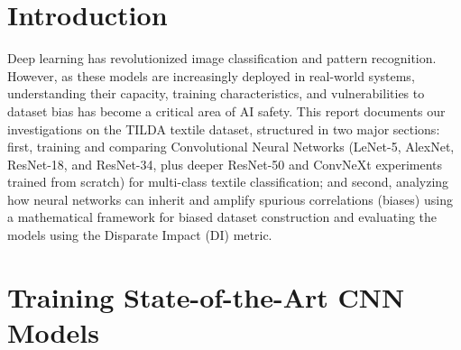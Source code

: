 \documentclass{name}
\newcounter{pagezero}
\begin{document}
\par 
\setcounter{page}{\value{pagezero}}

\newpage
\setcounter{page}{\value{pagezero}}
\tableofcontents

\newpage

\section{Introduction}
Deep learning has revolutionized image classification and pattern recognition. However, as these models are increasingly deployed in real-world systems, understanding their capacity, training characteristics, and vulnerabilities to dataset bias has become a critical area of AI safety. This report documents our investigations on the TILDA textile dataset, structured in two major sections: first, training and comparing Convolutional Neural Networks (LeNet-5, AlexNet, ResNet-18, and ResNet-34, plus deeper ResNet-50 and ConvNeXt experiments trained from scratch) for multi-class textile classification; and second, analyzing how neural networks can inherit and amplify spurious correlations (biases) using a mathematical framework for biased dataset construction and evaluating the models using the Disparate Impact (DI) metric.

\section{Training State-of-the-Art CNN Models}
\end{document}
